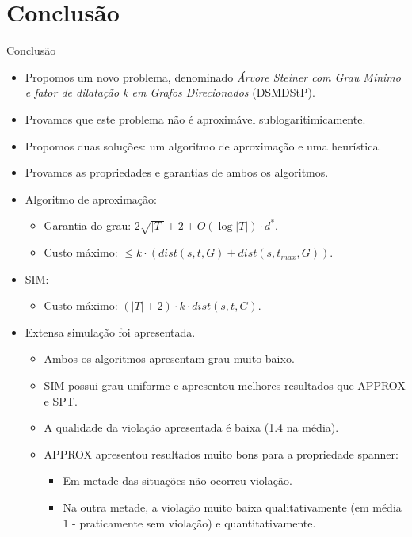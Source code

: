 \documentclass[10pt]{beamer}
\begin{document}
\section{Conclusão}
\begin{frame}[allowframebreaks]{Conclusão}
\begin{itemize}
  \item Propomos um novo problema, denominado \emph{Árvore Steiner com Grau Mínimo e fator de dilatação k em Grafos Direcionados} (DSMDStP).
  \item Provamos que este problema não é aproximável sublogaritimicamente.
  \item Propomos duas soluções: um algoritmo de aproximação e uma heurística.
  \item Provamos as propriedades e garantias de ambos os algoritmos.
  \item Algoritmo de aproximação:
  \begin{itemize}
    \item Garantia do grau: $2\sqrt{|T|} + 2 + O(\log{|T|})\cdot d^*$.
    \item Custo máximo: $\le k \cdot ( dist(s,t,G) + dist(s,t_{max},G))$.
  \end{itemize}
  \item SIM:
  \begin{itemize}
    \item Custo máximo: $(|T| + 2) \cdot k \cdot dist(s,t,G)$.
  \end{itemize}
  \item Extensa simulação foi apresentada.
  \begin{itemize}
    \item Ambos os algoritmos apresentam grau muito baixo.
    \item SIM possui grau uniforme e apresentou melhores resultados que APPROX e SPT.
    \item A qualidade da violação apresentada é baixa (1.4 na média).
    \item APPROX apresentou resultados muito bons para a propriedade spanner:
    \begin{itemize}
      \item Em metade das situações não ocorreu violação.
      \item Na outra metade, a violação muito baixa qualitativamente (em média $1$ - praticamente sem violação) e quantitativamente.
    \end{itemize}
  \end{itemize}
\end{itemize}
\end{frame}
\end{document}
